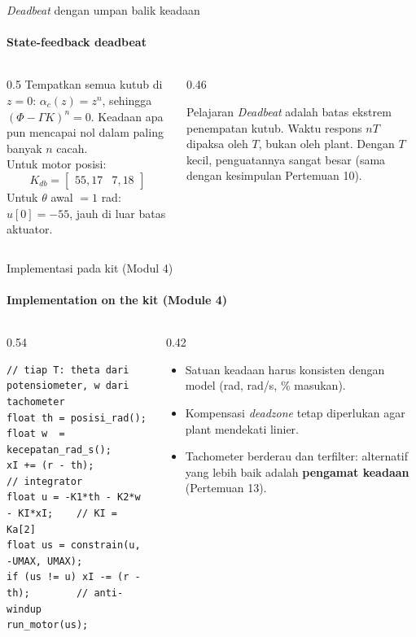 \documentclass[aspectratio=169,10pt]{beamer}
\begin{document}
\begin{frame}{\textit{Deadbeat} dengan umpan balik keadaan}
	\framesubtitle{State-feedback deadbeat}
	\begin{columns}[T]
		\begin{column}{0.5\textwidth}
			\small
			Tempatkan semua kutub di $z = 0$: $\alpha_c(z) = z^n$, sehingga $(\Phi - \Gamma K)^n = 0$. Keadaan apa pun mencapai nol dalam paling banyak $n$ cacah.\\[4pt]
			Untuk motor posisi:
			\[
				K_{db} = \begin{bmatrix}55{,}17 & 7{,}18\end{bmatrix}
			\]
			Untuk $\theta$ awal $=1$ rad: $u[0] = -55$, jauh di luar batas aktuator.
		\end{column}
		\begin{column}{0.46\textwidth}
			\begin{alertblock}{Pelajaran}
				\small
				\textit{Deadbeat} adalah batas ekstrem penempatan kutub. Waktu respons $nT$ dipaksa oleh $T$, bukan oleh plant. Dengan $T$ kecil, penguatannya sangat besar (sama dengan kesimpulan Pertemuan 10).
			\end{alertblock}
		\end{column}
	\end{columns}
\end{frame}

\begin{frame}[fragile]{Implementasi pada kit (Modul 4)}
	\framesubtitle{Implementation on the kit (Module 4)}
	\begin{columns}[T]
		\begin{column}{0.54\textwidth}
			\begin{block}{}
				\scriptsize
\begin{verbatim}
// tiap T: theta dari potensiometer, w dari tachometer
float th = posisi_rad();
float w  = kecepatan_rad_s();
xI += (r - th);                     // integrator
float u = -K1*th - K2*w - KI*xI;    // KI = Ka[2]
float us = constrain(u, -UMAX, UMAX);
if (us != u) xI -= (r - th);        // anti-windup
run_motor(us);
\end{verbatim}
			\end{block}
		\end{column}
		\begin{column}{0.42\textwidth}
			\small
			\begin{itemize}
				\item Satuan keadaan harus konsisten dengan model (rad, rad/s, \% masukan).
				\item Kompensasi \textit{deadzone} tetap diperlukan agar plant mendekati linier.
				\item Tachometer berderau dan terfilter: alternatif yang lebih baik adalah \textbf{pengamat keadaan} (Pertemuan 13).
			\end{itemize}
		\end{column}
	\end{columns}
\end{frame}
\end{document}
